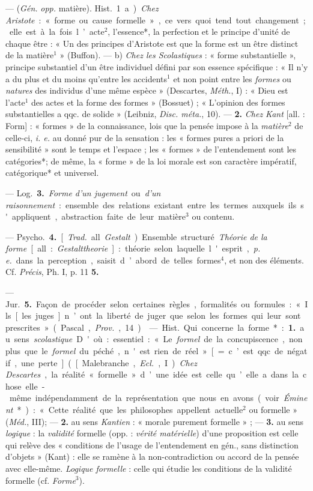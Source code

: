 \begin{itemize}[leftmargin=1cm, label=, itemsep=1pt]
 — ({\it Gén.} {\it opp.} matière). \si{Hist.} 1. a) {\it Chez
Aristote} : « forme ou cause formelle », ce vers quoi tend tout changement ;
elle est à la fois l’acte$^2$, l'essence*, la perfection et le principe
d'unité de chaque être : « Un des principes d’Aristote est que la forme est
un être distinct de la matière$^1$ » (Buffon). — b) {\it Chez les
Scolastiques} : « forme substantielle », principe substantiel d’un être
individuel défini par son essence spécifique : « Il n’y a du plus et du moins
qu'entre les accidents$^1$ et non point entre les {\it formes} ou
{\it natures} des individus d’une même espèce » (Descartes, {\it Méth.}, I) :
« Dieu est l’acte$^1$ des actes et la forme des formes » (Bossuet) ;
« L'opinion des formes substantielles a qqc. de solide » (Leibniz,
{\it Disc. méta.}, 10). — {\bf 2.} {\it Chez Kant} [all. : Form] : « formes »
de la connaissance, lois que la pensée impose à la {\it matière}$^2$ de
celle-ci, {\it i. e.} au donné pur de la sensation : les « formes pures a
priori de la sensibilité » sont le temps et l’espace ; les « formes » de
l’entendement sont les catégories*; de même, la « forme » de la loi morale
est son caractère impératif, catégorique* et universel.

— \si{Log.} {\bf 3.} {\it Forme d'un jugement} ou {\it d'un raisonnement} : ensemble des
relations existant entre les termes auxquels ils s'appliquent, abstraction faite de leur matière$^3$ ou contenu.

— \si{Psycho.} {\bf 4.} [{\it Trad.} all. {\it Gestalt}). Ensemble structuré.
{\it Théorie de la forme} [all. : {\it Gestalttheorie}] : théorie selon
laquelle l'esprit, {\it p. e.} dans la perception, saisit d’abord de telles
formes$^4$, et non des éléments. Cf. {\it Précis}, Ph. I, p. 11 {\bf 5.}

— \si{Jur.} {\bf 5.} Façon de procéder selon certaines règles, formalités ou
formules : « Ils [les juges] n’ont la liberté de juger que selon les formes
qui leur sont prescrites » (Pascal, {\it Prov.}, 14).

 — \si{Hist.} Qui concerne la forme* : {\bf 1.} au sens
{\it scolastique}. D'où : essentiel : « Le {\it formel} de la concupiscence,
non plus que le {\it formel} du péché, n'est rien de réel » [= c’est qqc. de
négatif, une perte] ([Malebranche, {\it Ecl.}, I). {\it Chez Descartes}, la
réalité « formelle » d’une idée est celle qu’elle a dans la chose elle-même
indépendamment de la représentation que nous en avons (voir {\it Éminent}*) :
« Cette réalité que les philosophes appellent actuelle$^2$ ou formelle »
({\it Méd.}, III); — {\bf 2.} au sens {\it Kantien} : « morale purement
formelle » ; — {\bf 3.} au sens {\it logique} : la {\it validité} formelle
(opp. : {\it vérité matérielle}) d’une proposition est celle qui relève des
« conditions de l’usage de l’entendement en gén., sans distinction
d'objets » (Kant) : elle se ramène à la non-contradiction ou accord de la
pensée avec elle-même. {\it Logique formelle} : celle qui étudie les
conditions de la validité formelle (cf. {\it Forme}$^3$).


\end{itemize}
